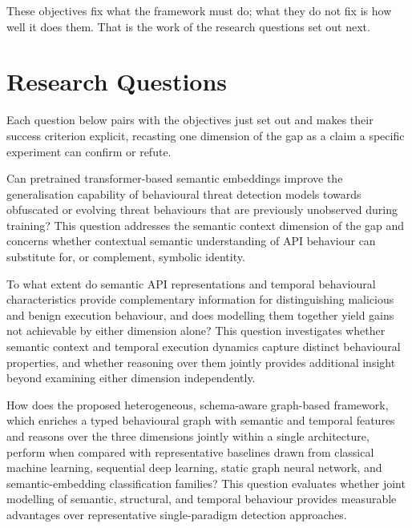 \documentclass[%
    BCOR=10mm,
    DIV=13,
    toc=bibliography,
    toc=listof,
    oneside,
    12pt,
]{scrbook}
\begin{document}
These objectives fix what the framework must do; what they do not fix is how well it
does them. That is the work of the research questions set out next.

\section{Research Questions}
\label{sec:research_questions}

Each question below pairs with the objectives just set out and makes their success
criterion explicit, recasting one dimension of the gap as a claim a specific
experiment can confirm or refute.

\begin{description}[leftmargin=0pt, labelwidth=0pt, labelsep=\parskip, style=nextline]

\item[\textbf{RQ1 -- Semantic Generalisation.}]
Can pretrained transformer-based semantic embeddings improve the
generalisation capability of behavioural threat detection models towards
obfuscated or evolving threat behaviours that are previously unobserved during
training? This question addresses the semantic context dimension of the
gap and concerns whether contextual semantic understanding of API behaviour
can substitute for, or complement, symbolic identity.

\item[\textbf{RQ2 -- Complementarity of Semantic and Temporal Signals.}]
To what extent do semantic API representations and temporal behavioural
characteristics provide complementary information for distinguishing malicious
and benign execution behaviour, and does modelling them together yield gains
not achievable by either dimension alone? This question investigates whether
semantic context and temporal execution dynamics capture distinct behavioural
properties, and whether reasoning over them jointly provides additional insight
beyond examining either dimension independently.

\item[\textbf{RQ3 -- End-to-End Detection Performance.}]
How does the proposed heterogeneous, schema-aware graph-based
framework, which enriches a typed behavioural graph with semantic and temporal
features and reasons over the three dimensions jointly within a single architecture,
perform when compared with representative baselines
drawn from classical machine learning, sequential deep learning, static graph
neural network, and semantic-embedding classification families? This question
evaluates whether joint modelling of semantic, structural, and temporal
behaviour provides measurable advantages over representative single-paradigm
detection approaches.


\end{description}
\end{document}
